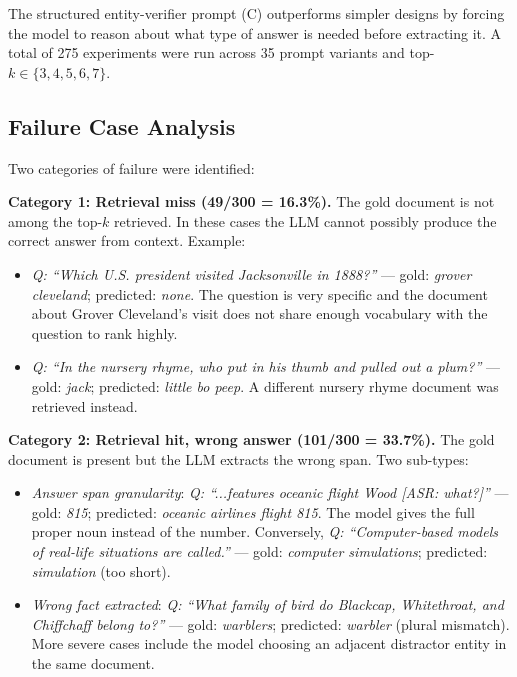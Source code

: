 \documentclass[11pt,a4paper]{article}
\begin{document}
The structured entity-verifier prompt (C) outperforms simpler designs by forcing the model to reason about what type of answer is needed before extracting it. A total of 275 experiments were run across 35 prompt variants and top-$k \in \{3,4,5,6,7\}$.

\subsection{Failure Case Analysis}

Two categories of failure were identified:

\textbf{Category 1: Retrieval miss (49/300 = 16.3\%).} The gold document is not among the top-$k$ retrieved. In these cases the LLM cannot possibly produce the correct answer from context. Example:

\begin{itemize}[noitemsep,topsep=2pt]
  \item \textit{Q: ``Which U.S. president visited Jacksonville in 1888?''} — gold: \textit{grover cleveland}; predicted: \textit{none}. The question is very specific and the document about Grover Cleveland's visit does not share enough vocabulary with the question to rank highly.
  \item \textit{Q: ``In the nursery rhyme, who put in his thumb and pulled out a plum?''} — gold: \textit{jack}; predicted: \textit{little bo peep}. A different nursery rhyme document was retrieved instead.
\end{itemize}

\textbf{Category 2: Retrieval hit, wrong answer (101/300 = 33.7\%).} The gold document is present but the LLM extracts the wrong span. Two sub-types:

\begin{itemize}[noitemsep,topsep=2pt]
  \item \textit{Answer span granularity}: \textit{Q: ``...features oceanic flight Wood [ASR: what?]''} — gold: \textit{815}; predicted: \textit{oceanic airlines flight 815}. The model gives the full proper noun instead of the number. Conversely, \textit{Q: ``Computer-based models of real-life situations are called.''} — gold: \textit{computer simulations}; predicted: \textit{simulation} (too short).
  \item \textit{Wrong fact extracted}: \textit{Q: ``What family of bird do Blackcap, Whitethroat, and Chiffchaff belong to?''} — gold: \textit{warblers}; predicted: \textit{warbler} (plural mismatch). More severe cases include the model choosing an adjacent distractor entity in the same document.
\end{itemize}
\end{document}
